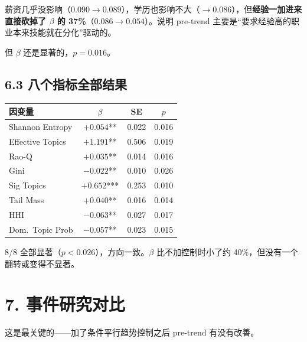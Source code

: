 \documentclass[12pt,a4paper]{article}
\begin{document}
薪资几乎没影响（$0.090 \rightarrow 0.089$），学历也影响不大（$\rightarrow 0.086$），但\textbf{经验一加进来直接砍掉了 $\beta$ 的 37\%}（$0.086 \rightarrow 0.054$）。说明 pre-trend 主要是“要求经验高的职业本来技能就在分化”驱动的。

但 $\beta$ 还是显著的，$p = 0.016$。

\subsection*{6.3 八个指标全部结果}

\begin{center}
\small
\begin{tabular}{lccc}
\toprule
因变量 & $\beta$ & SE & $p$ \\
\midrule
Shannon Entropy & $+0.054$** & 0.022 & 0.016 \\
Effective Topics & $+1.191$** & 0.506 & 0.019 \\
Rao-Q & $+0.035$** & 0.014 & 0.016 \\
Gini & $-0.022$** & 0.010 & 0.026 \\
Sig Topics & $+0.652$*** & 0.253 & 0.010 \\
Tail Mass & $+0.040$** & 0.016 & 0.014 \\
HHI & $-0.063$** & 0.027 & 0.017 \\
Dom.\ Topic Prob & $-0.057$** & 0.023 & 0.015 \\
\bottomrule
\end{tabular}
\end{center}

8/8 全部显著（$p < 0.026$），方向一致。$\beta$ 比不加控制时小了约 40\%，但没有一个翻转或变得不显著。

\bigskip

\section*{7. 事件研究对比}

这是最关键的——加了条件平行趋势控制之后 pre-trend 有没有改善。
\end{document}

